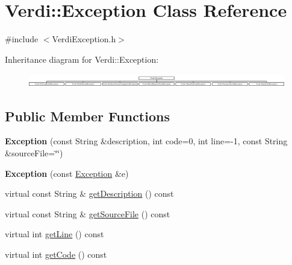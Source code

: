 \hypertarget{class_verdi_1_1_exception}{\section{\-Verdi\-:\-:\-Exception \-Class \-Reference}
\label{class_verdi_1_1_exception}
}


{\ttfamily \#include $<$\-Verdi\-Exception.\-h$>$}

\-Inheritance diagram for \-Verdi\-:\-:\-Exception\-:\begin{figure}[H]
\begin{center}
\leavevmode
\includegraphics[height=0.565371cm]{class_verdi_1_1_exception}
\end{center}
\end{figure}
\subsection*{\-Public \-Member \-Functions}
\begin{DoxyCompactItemize}
\item 
\hypertarget{class_verdi_1_1_exception_a27a0eeeb40399a82a6202acfe3b25cd5}{{\bfseries \-Exception} (const \-String \&description, int code=0, int line=-\/1, const \-String \&source\-File=\char`\"{}\char`\"{})}\label{class_verdi_1_1_exception_a27a0eeeb40399a82a6202acfe3b25cd5}

\item 
\hypertarget{class_verdi_1_1_exception_abec9c930d86023dca934b75c567a0466}{{\bfseries \-Exception} (const \hyperlink{class_verdi_1_1_exception}{\-Exception} \&e)}\label{class_verdi_1_1_exception_abec9c930d86023dca934b75c567a0466}

\item 
virtual const \-String \& \hyperlink{class_verdi_1_1_exception_a07a4c7be6b09f4e56a0040dc9e8389da}{get\-Description} () const 
\item 
virtual const \-String \& \hyperlink{class_verdi_1_1_exception_a974968edf92602903549184264053818}{get\-Source\-File} () const 
\item 
virtual int \hyperlink{class_verdi_1_1_exception_a5df63a8ec9931fc3cc3d651ef06ae1df}{get\-Line} () const 
\item 
virtual int \hyperlink{class_verdi_1_1_exception_a62da10bb91c665cedfba39a3bced967c}{get\-Code} () const 
\end{DoxyCompactItemize}
